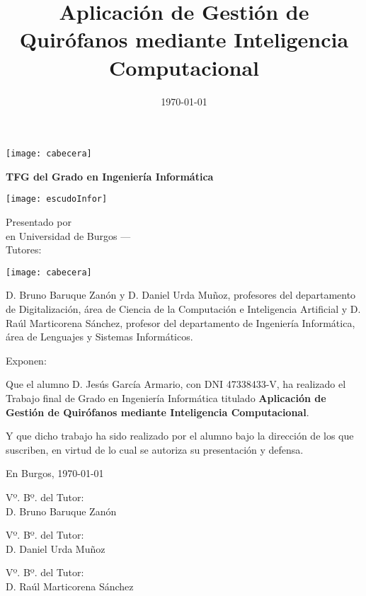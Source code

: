\documentclass[a4paper,12pt,twoside]{memoir}
\title{Aplicación de Gestión de Quirófanos mediante Inteligencia Computacional}
\author{\nombre}
\date{\today}
\makeatletter
\def\maketitle{
  \null
  \thispagestyle{empty}
\noindent\texttt{[image: cabecera]}\vspace{1cm}%
  \vfill
  \colorbox{cpardoBox}{%
    \begin{minipage}{.8\textwidth}
      \vspace{.5cm}\Large
      \begin{center}
      \textbf{TFG del Grado en Ingeniería Informática}\vspace{.6cm}\\
      \textbf{\LARGE\@title{}}
      \end{center}
      \vspace{.2cm}
    \end{minipage}

  }%
  \hfill\begin{minipage}{.20\textwidth}
    \texttt{[image: escudoInfor]}
  \end{minipage}
  \vfill
  \begin{center}%
  {%
    \noindent\LARGE
    Presentado por \@author{}\\ 
    en Universidad de Burgos --- \@date{}\\
    Tutores: \@tutor{}\\
  }%
  \end{center}%
  \null
  \cleardoublepage
  }
\newcommand{\nombre}{Jesús García Armario} %
\makeatother
\begin{document}
\maketitle


\newpage\null\thispagestyle{empty}\newpage


\thispagestyle{empty}


\noindent\texttt{[image: cabecera]}\vspace{1cm}

\noindent D. Bruno Baruque Zanón y D. Daniel Urda Muñoz, profesores del departamento de Digitalización, área de Ciencia de la Computación e Inteligencia Artificial y D. Raúl Marticorena Sánchez, profesor del departamento de Ingeniería Informática, área de Lenguajes y Sistemas Informáticos.

\noindent Exponen:

\noindent Que el alumno D. \nombre, con DNI 47338433-V, ha realizado el Trabajo final de Grado en Ingeniería Informática titulado \textbf{Aplicación de Gestión de Quirófanos mediante Inteligencia Computacional}. 

\noindent Y que dicho trabajo ha sido realizado por el alumno bajo la dirección de los que suscriben, en virtud de lo cual se autoriza su presentación y defensa.

\begin{center} %
En Burgos, {\large \today}
\end{center}

\vfill\vfill\vfill

\begin{minipage}{0.35\textwidth}
\begin{flushleft} %
Vº. Bº. del Tutor:\\[2cm]
D. Bruno Baruque Zanón
\end{flushleft}
\end{minipage}
\hfill
\begin{minipage}{0.35\textwidth}
\begin{flushleft} %
Vº. Bº. del Tutor:\\[2cm]
D. Daniel Urda Muñoz
\end{flushleft}
\end{minipage}
\hfill


\begin{minipage}{0.35\textwidth}
\begin{flushleft}%
Vº. Bº. del Tutor:\\[2cm]
D. Raúl Marticorena Sánchez
\end{flushleft}
\end{minipage}
\hfill
\end{document}
